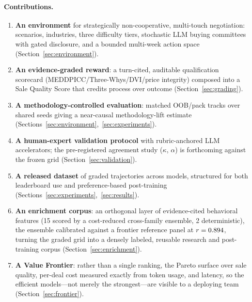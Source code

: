 \paragraph{Contributions.}
\begin{enumerate}[leftmargin=1.4em,itemsep=2pt,topsep=2pt]
  \item \textbf{An environment} for strategically non-cooperative, multi-touch
  negotiation: \numScenarios{} scenarios, \numIndustries{} industries, three
  difficulty tiers, stochastic LLM buying committees with gated disclosure, and
  a bounded multi-week action space (Section~\ref{sec:environment}).
  \item \textbf{An evidence-graded reward}: a turn-cited, auditable qualification
  scorecard (MEDDPICC/Three-Whys/DVI/price integrity) composed into a Sale
  Quality Score that credits process over outcome (Section~\ref{sec:grading}).
  \item \textbf{A methodology-controlled evaluation}: matched OOB/pack tracks
  over shared seeds giving a near-causal methodology-lift estimate
  (Sections~\ref{sec:environment},~\ref{sec:experiments}).
  \item \textbf{A human-expert validation protocol} with rubric-anchored
  LLM accelerators; the pre-registered agreement study ($\kappa$, $\alpha$) is
  forthcoming against the frozen grid (Section~\ref{sec:validation}).
  \item \textbf{A released dataset} of \gridCellsTotal{} graded trajectories
  across \numModels{} models, structured for both leaderboard use and
  preference-based post-training (Sections~\ref{sec:experiments},~\ref{sec:results}).
  \item \textbf{An enrichment corpus}: an orthogonal layer of \numAiFeatures{}
  evidence-cited behavioral features (15 scored by a cost-reduced cross-family
  ensemble, 2 deterministic), the ensemble calibrated against a frontier reference panel at
  $r=0.894{}$, turning the graded grid into a densely labeled,
  reusable research and post-training corpus (Section~\ref{sec:enrichment}).
  \item \textbf{A Value Frontier}: rather than a single ranking, the Pareto
  surface over sale quality, per-deal cost measured exactly from token usage,
  and latency, so the efficient models---not merely the strongest---are visible
  to a deploying team (Section~\ref{sec:frontier}).
\end{enumerate}
